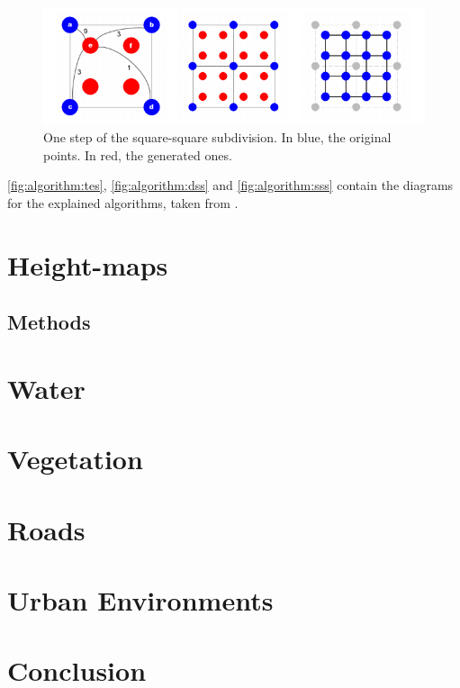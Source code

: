 \documentclass{acmtog}
\begin{document}
\begin{figure}
	\begin{center}
		\includegraphics[width=\columnwidth]{images/algorithm/squaresquare.png}
	\end{center}
	\caption{One step of the square-square subdivision. In blue, the original points. In red, the generated ones.}
	\label{fig:algorithm:sss}
\end{figure}

\autoref{fig:algorithm:tes}, \autoref{fig:algorithm:dss} and \autoref{fig:algorithm:sss} contain the diagrams for the explained algorithms, taken from \cite{Macklem03}.



\section{Height-maps}
\subsection{Methods}

\section{Water}

\section{Vegetation}

\section{Roads}

\section{Urban Environments}

\section{Conclusion}
\end{document}
